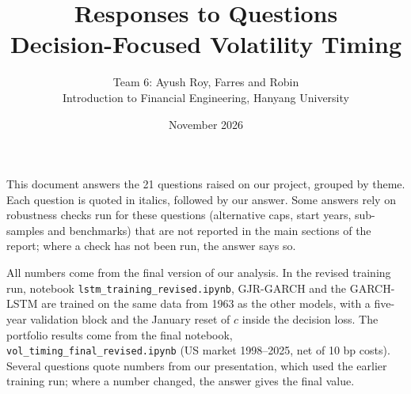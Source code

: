 \documentclass[12pt]{article}
\title{\textbf{Responses to Questions}\\[4pt]\large Decision-Focused Volatility Timing}
\author{Team 6: Ayush Roy, Farres and Robin\\[2pt]\small Introduction to Financial Engineering, Hanyang University}
\date{November 2026}
\begin{document}
\maketitle
\noindent This document answers the 21 questions raised on our project, grouped by theme. Each question is quoted in italics, followed by our answer. Some answers rely on robustness checks run for these questions (alternative caps, start years, sub-samples and benchmarks) that are not reported in the main sections of the report; where a check has not been run, the answer says so.

\noindent All numbers come from the final version of our analysis. In the revised training run, notebook \texttt{lstm\_training\_revised.ipynb}, GJR-GARCH and the GARCH-LSTM are trained on the same data from 1963 as the other models, with a five-year validation block and the January reset of $c$ inside the decision loss. The portfolio results come from the final notebook, \texttt{vol\_timing\_final\_revised.ipynb} (US market 1998--2025, net of 10 bp costs). Several questions quote numbers from our presentation, which used the earlier training run; where a number changed, the answer gives the final value.

\end{document}
